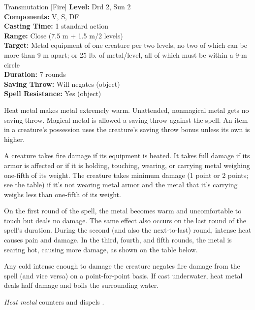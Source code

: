 {Transmutation [Fire]}
{
	\textbf{Level:}
	Drd 2, Sun 2\\
	\textbf{Components:}
	V, S, DF\\
	\textbf{Casting Time:}
	1 standard action\\
	\textbf{Range:}
	Close (7.5 m + 1.5 m/2 levels)\\
	\textbf{Target:}
	Metal equipment of one creature per two levels, no two of which can be more than 9 m apart; or 25 lb. of metal/level, all of which must be within a 9-m circle\\
	\textbf{Duration:}
	7 rounds\\
	\textbf{Saving Throw:}
	Will negates (object)\\
	\textbf{Spell Resistance:}
	Yes (object)\\
}
{
	Heat metal makes metal extremely warm. Unattended, nonmagical metal gets no saving throw. Magical metal is allowed a saving throw against the spell. An item in a creature's possession uses the creature's saving throw bonus unless its own is higher.

	A creature takes fire damage if its equipment is heated. It takes full damage if its armor is affected or if it is holding, touching, wearing, or carrying metal weighing one-fifth of its weight. The creature takes minimum damage (1 point or 2 points; see the table) if it's not wearing metal armor and the metal that it's carrying weighs less than one-fifth of its weight.


	On the first round of the spell, the metal becomes warm and uncomfortable to touch but deals no damage. The same effect also occurs on the last round of the spell's duration. During the second (and also the next-to-last) round, intense heat causes pain and damage. In the third, fourth, and fifth rounds, the metal is searing hot, causing more damage, as shown on the table below.

	Any cold intense enough to damage the creature negates fire damage from the spell (and vice versa) on a point-for-point basis. If cast underwater, heat metal deals half damage and boils the surrounding water.

	\emph{Heat metal} counters and dispels .

}
